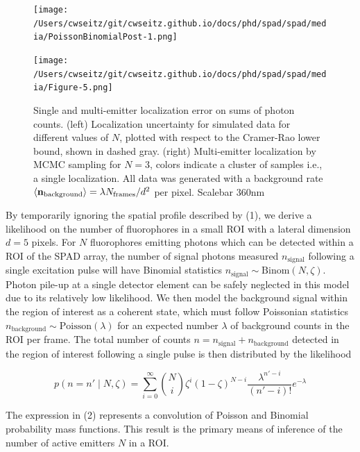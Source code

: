 \begin{figure}[t]
\centering
\texttt{[image: /Users/cwseitz/git/cwseitz.github.io/docs/phd/spad/spad/media/PoissonBinomialPost-1.png]}
\caption{}
\end{figure}    


\begin{figure}[t]
\centering
\texttt{[image: /Users/cwseitz/git/cwseitz.github.io/docs/phd/spad/spad/media/Figure-5.png]}
\caption{Single and multi-emitter localization error on sums of photon counts. (left) Localization uncertainty for simulated data for different values of $N$, plotted with respect to the Cramer-Rao lower bound, shown in dashed gray. (right) Multi-emitter localization by MCMC sampling for $N=3$, colors indicate a cluster of samples i.e., a single localization. All data was generated with a background rate $\langle \bold{n}_{\mathrm{background}} \rangle = \lambda N_{\mathrm{frames}}/d^{2}$ per pixel. Scalebar 360nm}
\end{figure}   

By temporarily ignoring the spatial profile described by (1), we derive a likelihood on the number of fluorophores in a small ROI with a lateral dimension $d = 5$ pixels. For $N$ fluorophores emitting photons which can be detected within a ROI of the SPAD array, the number of signal photons measured $n_{\mathrm{signal}}$ following a single excitation pulse will have Binomial statistics $n_{\mathrm{signal}} \sim \mathrm{Binom}(N,\zeta)$. Photon pile-up at a single detector element can be safely neglected in this model due to its relatively low likelihood. We then model the background signal within the region of interest as a coherent state, which must follow Poissonian statistics $n_{\mathrm{background}} \sim \mathrm{Poisson}(\lambda)$ for an expected number $\lambda$ of background counts in the ROI per frame. The total number of counts $n=n_{\mathrm{signal}}+n_{\mathrm{background}}$ detected in the region of interest following a single pulse is then distributed by the likelihood

\begin{equation}
p(n=n' \mid N, \zeta) = \sum_{i=0}^{\infty} \binom{N}{i} \zeta^i (1-\zeta)^{N-i} \frac{\lambda^{n'-i}}{(n'-i)!} e^{-\lambda}
\end{equation}

The expression in (2) represents a convolution of Poisson and Binomial probability mass functions. This result is the primary means of inference of the number of active emitters $N$ in a ROI.

